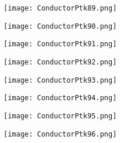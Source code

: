 \documentclass[pdf]{beamer}
\begin{document}
\begin{frame}
\begin{figure}[!h]
\centering
\texttt{[image: ConductorPtk89.png]}
\end{figure}
\end{frame}

\begin{frame}
\begin{figure}[!h]
\centering
\texttt{[image: ConductorPtk90.png]}
\end{figure}
\end{frame}

\begin{frame}
\begin{figure}[!h]
\centering
\texttt{[image: ConductorPtk91.png]}
\end{figure}
\end{frame}

\begin{frame}
\begin{figure}[!h]
\centering
\texttt{[image: ConductorPtk92.png]}
\end{figure}
\end{frame}

\begin{frame}
\begin{figure}[!h]
\centering
\texttt{[image: ConductorPtk93.png]}
\end{figure}
\end{frame}

\begin{frame}
\begin{figure}[!h]
\centering
\texttt{[image: ConductorPtk94.png]}
\end{figure}
\end{frame}

\begin{frame}
\begin{figure}[!h]
\centering
\texttt{[image: ConductorPtk95.png]}
\end{figure}
\end{frame}

\begin{frame}
\begin{figure}[!h]
\centering
\texttt{[image: ConductorPtk96.png]}
\end{figure}
\end{frame}
\end{document}
